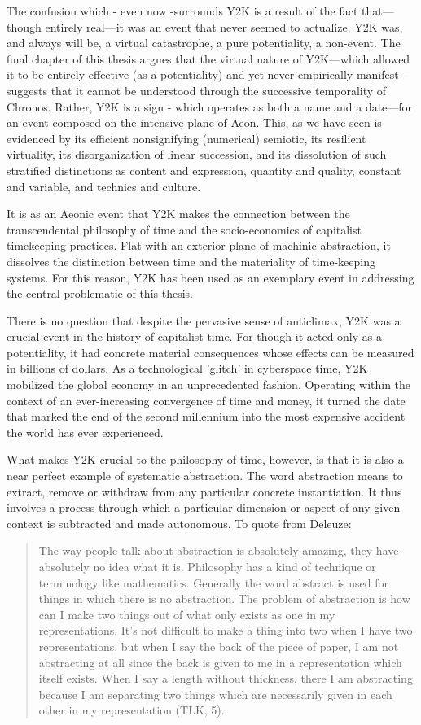 The confusion which - even now -surrounds Y2K is a result of the fact that---though entirely real---it was an event that never seemed to actualize. Y2K was, and always will be, a virtual catastrophe, a pure potentiality, a non-event. The final chapter of this thesis argues that the virtual nature of Y2K---which allowed it to be entirely effective (as a potentiality) and yet never empirically manifest---suggests that it cannot be understood through the successive temporality of Chronos. Rather, Y2K is a sign - which operates as both a name and a date---for an event composed on the intensive plane of Aeon. This, as we have seen is evidenced by its efficient nonsignifying (numerical) semiotic, its resilient virtuality, its disorganization of linear succession, and its dissolution of such stratified distinctions as content and expression, quantity and quality, constant and variable, and technics and culture.

It is as an Aeonic event that Y2K makes the connection between the transcendental philosophy of time and the socio-economics of capitalist timekeeping practices. Flat with an exterior plane of machinic abstraction, it dissolves the distinction between time and the materiality of time-keeping systems. For this reason, Y2K has been used as an exemplary event in addressing the central problematic of this thesis.

There is no question that despite the pervasive sense of anticlimax, Y2K was a crucial event in the history of capitalist time. For though it acted only as a potentiality, it had concrete material consequences whose effects can be measured in billions of dollars. As a technological 'glitch' in cyberspace time, Y2K mobilized the global economy in an unprecedented fashion. Operating within the context of an ever-increasing convergence of time and money, it turned the date that marked the end of the second millennium into the most expensive accident the world has ever experienced.

What makes Y2K crucial to the philosophy of time, however, is that it is also a near perfect example of systematic abstraction. The word abstraction means to extract, remove or withdraw from any particular concrete instantiation. It thus involves a process through which a particular dimension or aspect of any given context is subtracted and made autonomous. To quote from Deleuze: 

\begin{quote}
    The way people talk about abstraction is absolutely amazing, they have absolutely no idea what it is. Philosophy has a kind of technique or terminology like mathematics. Generally the word abstract is used for things in which there is no abstraction. The problem of abstraction is how can I make two things out of what only exists as one in my representations. It's not difficult to make a thing into two when I have two representations, but when I say the back of the piece of paper, I am not abstracting at all since the back is given to me in a representation which itself exists. When I say a length without thickness, there I am abstracting because I am separating two things which are necessarily given in each other in my representation (TLK, 5).
\end{quote}


